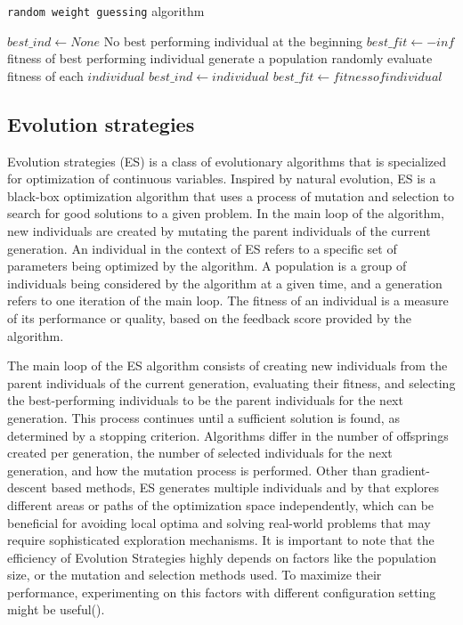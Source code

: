 \begin{algorithm}
\caption{\texttt{random weight guessing} algorithm}
\label{algo:random_weight_guessing}
\begin{algorithmic}[1]
\State $best\_ind \gets None$ \Comment No best performing individual at the beginning
\State $best\_fit \gets -inf$ \Comment fitness of best performing individual
  \State generate a population randomly
  \State evaluate fitness of each $individual$ 
    \State $best\_ind \gets individual$
    \State $best\_fit \gets fitness of individual$
  \EndIf
\EndWhile
\end{algorithmic}
\end{algorithm}


\subsection{Evolution strategies}

Evolution strategies (ES) is a class of evolutionary algorithms that is specialized for optimization of continuous variables. Inspired by natural evolution, ES is a black-box optimization algorithm that uses a process of mutation and selection to search for good solutions to a given problem. In the main loop of the algorithm, new individuals are created by mutating the parent individuals of the current generation. An individual in the context of ES refers to a specific set of parameters being optimized by the algorithm. A population is a group of individuals being considered by the algorithm at a given time, and a generation refers to one iteration of the main loop. The fitness of an individual is a measure of its performance or quality, based on the feedback score provided by the algorithm.

The main loop of the ES algorithm consists of creating new individuals from the parent individuals of the current generation, evaluating their fitness, and selecting the best-performing individuals to be the parent individuals for the next generation. This process continues until a sufficient solution is found, as determined by a stopping criterion. Algorithms differ in the number of offsprings created per generation, the number of selected individuals for the next generation, and how the mutation process is performed. Other than gradient-descent based methods, ES generates multiple individuals and by that explores different areas or paths of the optimization space independently, which can be beneficial for avoiding local optima and solving real-world problems that may require sophisticated exploration mechanisms. It is important to note that the efficiency of Evolution Strategies highly depends on factors like the population size, or the mutation and selection methods used. To maximize their performance, experimenting on this factors with different configuration setting might be useful(\cite{salimans_evolution_2017}). 


